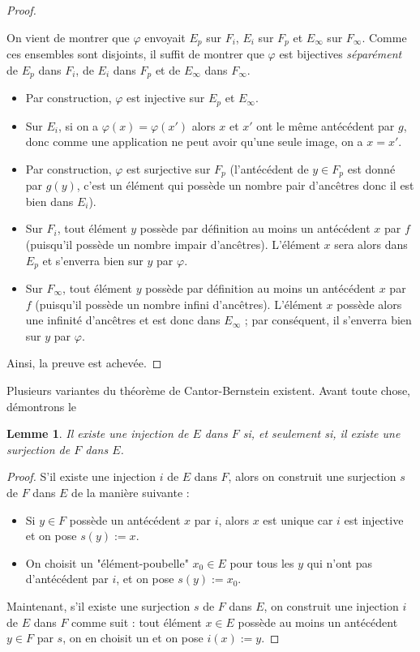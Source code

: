 \documentclass[french]{book}
\theoremstyle{plain}
\newtheorem{lem}{Lemme}[chapter]
\theoremstyle{definition}
\theoremstyle{remark}
\begin{document}
\begin{proof}
\begin{itemize}
	\end{itemize}
	On vient de montrer que $\varphi$ envoyait $E_p$ sur $F_i$, $E_i$ sur $F_p$ et $E_\infty$ sur $F_\infty$. Comme ces ensembles sont disjoints, il suffit de montrer que $\varphi$ est bijectives \textit{séparément} de $E_p$ dans $F_i$, de $E_i$ dans $F_p$ et de $E_\infty$ dans $F_\infty$.
	\begin{itemize}
		\item Par construction, $\varphi$ est injective sur $E_p$ et $E_\infty$.
		\item Sur $E_i$, si on a $\varphi(x)=\varphi(x')$ alors $x$ et $x'$ ont le même antécédent par $g$, donc comme une application ne peut avoir qu'une seule image, on a $x=x'$.
		\item Par construction, $\varphi$ est surjective sur $F_p$ (l'antécédent de $y\in F_p$ est donné par $g(y)$, c'est un élément qui possède un nombre pair d'ancêtres donc il est bien dans $E_i$).
		\item Sur $F_i$, tout élément $y$ possède par définition au moins un antécédent $x$ par $f$ (puisqu'il possède un nombre impair d'ancêtres). L'élément $x$ sera alors dans $E_p$ et s'enverra bien sur $y$ par $\varphi$.
		\item Sur $F_\infty$, tout élément $y$ possède par définition au moins un antécédent $x$ par $f$ (puisqu'il possède un nombre infini d'ancêtres). L'élément $x$ possède alors une infinité d'ancêtres et est donc dans $E_\infty$ ; par conséquent, il s'enverra bien sur $y$ par $\varphi$.
	\end{itemize}
	Ainsi, la preuve est achevée.
\end{proof}
Plusieurs variantes du théorème de Cantor-Bernstein existent. Avant toute chose, démontrons le 
\begin{lem}
	Il existe une injection de $E$ dans $F$ si, et seulement si, il existe une surjection de $F$ dans $E$. 
\end{lem}
\begin{proof}
	S'il existe une injection $i$ de $E$ dans $F$, alors on construit une surjection $s$ de $F$ dans $E$ de la manière suivante : 
	\begin{itemize}
		\item Si $y\in F$ possède un antécédent $x$ par $i$, alors $x$ est unique car $i$ est injective et on pose $s(y):=x$.
		\item On choisit un "élément-poubelle" $x_0\in E$ pour tous les $y$ qui n'ont pas d'antécédent par $i$, et on pose $s(y):=x_0$.
	\end{itemize}
	Maintenant, s'il existe une surjection $s$ de $F$ dans $E$, on construit une injection $i$ de $E$ dans $F$ comme suit : tout élément $x\in E$ possède au moins un antécédent $y\in F$ par $s$, on en choisit un et on pose $i(x):=y$.
\end{proof}
\end{document}
